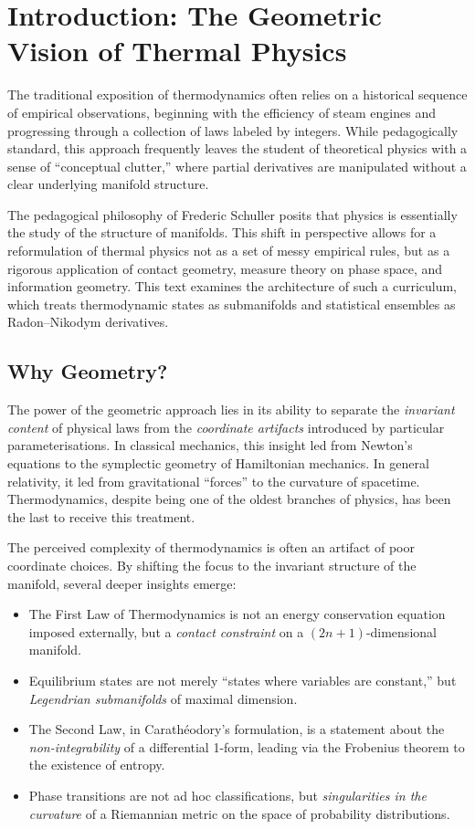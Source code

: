 \chapter{Introduction: The Geometric Vision of Thermal Physics}

The traditional exposition of thermodynamics often relies on a historical sequence of empirical observations, beginning with the efficiency of steam engines and progressing through a collection of laws labeled by integers. While pedagogically standard, this approach frequently leaves the student of theoretical physics with a sense of ``conceptual clutter,'' where partial derivatives are manipulated without a clear underlying manifold structure.

The pedagogical philosophy of Frederic Schuller posits that physics is essentially the study of the structure of manifolds. This shift in perspective allows for a reformulation of thermal physics not as a set of messy empirical rules, but as a rigorous application of contact geometry, measure theory on phase space, and information geometry. This text examines the architecture of such a curriculum, which treats thermodynamic states as submanifolds and statistical ensembles as Radon--Nikodym derivatives.

\section{Why Geometry?}

The power of the geometric approach lies in its ability to separate the \emph{invariant content} of physical laws from the \emph{coordinate artifacts} introduced by particular parameterisations. In classical mechanics, this insight led from Newton's equations to the symplectic geometry of Hamiltonian mechanics. In general relativity, it led from gravitational ``forces'' to the curvature of spacetime. Thermodynamics, despite being one of the oldest branches of physics, has been the last to receive this treatment.

The perceived complexity of thermodynamics is often an artifact of poor coordinate choices. By shifting the focus to the invariant structure of the manifold, several deeper insights emerge:

\begin{itemize}
\item The First Law of Thermodynamics is not an energy conservation equation imposed externally, but a \emph{contact constraint} on a $(2n+1)$-dimensional manifold.
\item Equilibrium states are not merely ``states where variables are constant,'' but \emph{Legendrian submanifolds} of maximal dimension.
\item The Second Law, in Carath\'eodory's formulation, is a statement about the \emph{non-integrability} of a differential 1-form, leading via the Frobenius theorem to the existence of entropy.
\item Phase transitions are not ad hoc classifications, but \emph{singularities in the curvature} of a Riemannian metric on the space of probability distributions.
\end{itemize}

